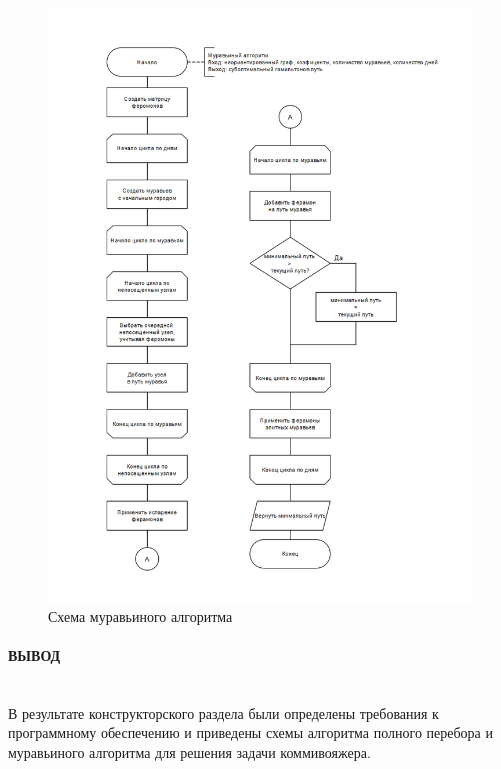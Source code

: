 \begin{figure}[h]
    \centering
    \includegraphics[width=1\textwidth]{images/schemes/ant.png}
    \caption{Схема муравьиного алгоритма}
    \label{fig:ant}
\end{figure}

\clearpage

\paragraph*{ВЫВОД} ${}$ \\

В результате конструкторского раздела были определены требования к программному обеспечению и приведены схемы алгоритма полного перебора и муравьиного алгоритма для решения задачи коммивояжера.
